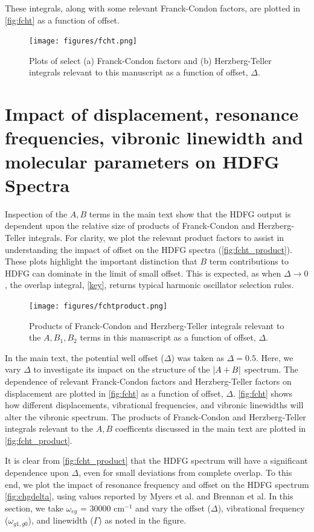 \documentclass[aip, jcp, reprint, onecolumn, nofootinbib]{revtex4-2}
\begin{document}
These integrals, along with some relevant Franck-Condon factors, are plotted in \autoref{fig:fcht} as a function of offset. 

\begin{figure}[!htbp]
	\centering
	\texttt{[image: figures/fcht.png]}
	\caption{Plots of select (a) Franck-Condon factors and (b) Herzberg-Teller integrals relevant to this manuscript as a function of offset, $\Delta$.} 
	\label{fig:fcht}
\end{figure}


\newpage
\section{Impact of displacement, resonance frequencies, vibronic linewidth and molecular parameters on HDFG Spectra}
Inspection of the $A,B$ terms in the main text show that the HDFG output is dependent upon the relative size of products of Franck-Condon and Herzberg-Teller integrals.
For clarity, we plot the relevant product factors to assist in understanding the impact of offset on the HDFG spectra (\autoref{fig:fcht_product}).
These plots highlight the important distinction that $B$ term contributions to HDFG can dominate in the limit of small offset.
This is expected, as when $\Delta \rightarrow 0$, the overlap integral, \autoref{key}, returns typical harmonic oscillator selection rules.

\begin{figure}[!htbp]
	\centering
	\texttt{[image: figures/fchtproduct.png]}
	\caption{Products of Franck-Condon and Herzberg-Teller integrals relevant to the $A, B_1, B_2$ terms in this manuscript as a function of offset, $\Delta$.} 
	\label{fig:fcht_product}
\end{figure}

In the main text, the potential well offset ($\Delta$) was taken as $\Delta = 0.5$.
Here, we vary $\Delta$ to investigate its impact on the structure of the $\abs{A+B}$ spectrum.
The dependence of relevant Franck-Condon factors and Herzberg-Teller factors on displacement are plotted in \autoref{fig:fcht} as a function of offset, $\Delta$.
\autoref{fig:fcht} shows how different displacements, vibrational frequencies, and vibronic linewidths will alter the vibronic spectrum.
The products of Franck-Condon and Herzberg-Teller integrals relevant to the $A,B$ coefficents discussed in the main text are plotted in \autoref{fig:fcht_product}.

\pagebreak

It is clear from \autoref{fig:fcht_product} that the HDFG spectrum will have a significant dependence upon $\Delta$, even for small deviations from complete overlap. 
To this end, we plot the impact of resonance frequency and offset on the HDFG spectrum \autoref{fig:chgdelta}, using values reported by Myers et al. and Brennan et al. \cite{Myers1982, Brennan2024}
In this section, we take $\omega_{eg}$ = $30000$ cm$^{-1}$ and vary the offset ($\Delta$), vibrational frequency ($\omega_{g1,g0}$), and linewidth ($\Gamma$) as noted in the figure.
\end{document}

